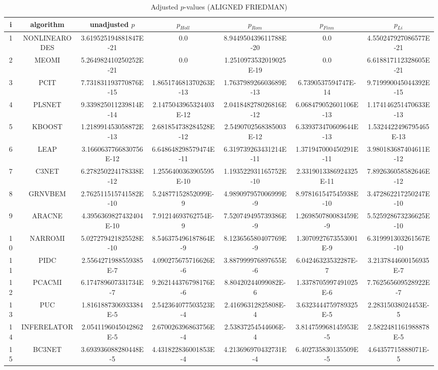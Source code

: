 \documentclass[a4paper,10pt]{article}
\begin{document}
\begin{landscape}
\begin{table}[!htp]
\centering\scriptsize
\caption{Adjusted $p$-values (ALIGNED FRIEDMAN)}
\begin{tabular}{ccccccc}
i&algorithm&unadjusted $p$&$p_{Holl}$&$p_{Rom}$&$p_{Finn}$&$p_{Li}$\\
\hline
1&NONLINEARODES&3.619525194881847E-21&0.0&8.944950439611788E-20&0.0&4.550247927086577E-21\\
2&MEOMI&5.264982410250252E-21&0.0&1.2510973532019025E-19&0.0&6.618817112328605E-21\\
3&PCIT&7.731831193770876E-15&1.865174681370263E-13&1.763798926603689E-13&6.7390537594747E-14&9.719990045044392E-15\\
4&PLSNET&9.339825011239814E-14&2.1475043965324403E-12&2.041848278026816E-12&6.068479052601106E-13&1.174146251470633E-13\\
5&KBOOST&1.218991453058872E-13&2.681854738284528E-12&2.5490702568385003E-12&6.339373470609644E-13&1.5324422496795465E-13\\
6&LEAP&3.1660637766830756E-12&6.648648298579474E-11&6.319739263431214E-11&1.371947000450291E-11&3.980183687404611E-12\\
7&C3NET&6.278250224178338E-12&1.2556400363905595E-10&1.193522931165752E-10&2.3319013386924325E-11&7.892636058582646E-12\\
8&GRNVBEM&2.762511515741582E-10&5.24877152852099E-9&4.989097957006999E-9&8.978161547545938E-10&3.472862217250247E-10\\
9&ARACNE&4.3956369827432404E-10&7.91214693762754E-9&7.520749495739386E-9&1.269850780083459E-9&5.525928673236625E-10\\
10&NARROMI&5.027279421825528E-10&8.546375496187864E-9&8.123656580407769E-9&1.3070927673553001E-9&6.319991303261567E-10\\
11&PIDC&2.5564271988559385E-7&4.090275675716626E-6&3.887999976897655E-6&6.04246323532287E-7&3.2137844600156935E-7\\
12&PCACMI&6.174789607331734E-7&9.262144376798176E-6&8.80420244099082E-6&1.3378705997491025E-6&7.762565609528922E-7\\
13&PUC&1.8161887306933384E-5&2.542364077503523E-4&2.41696312825808E-4&3.6323444759789325E-5&2.28315038024453E-5\\
14&INFERELATOR&2.0541196045042862E-5&2.670026396863756E-4&2.53837254544606E-4&3.814759968145953E-5&2.5822481161988878E-5\\
15&BC3NET&3.693936088280448E-5&4.431822836001853E-4&4.213696970432731E-4&6.402735830135509E-5&4.64357715888071E-5\\

\end{tabular}
\end{table}
\end{landscape}
\end{document}

